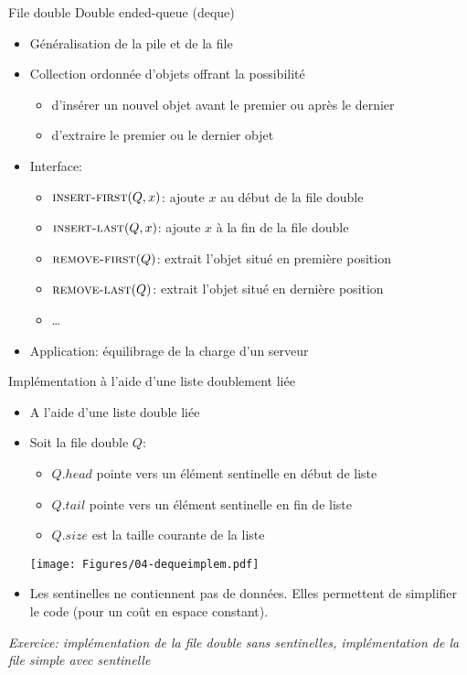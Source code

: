 \begin{frame}{File double}
Double ended-queue (deque)

\bigskip

\begin{itemize}
\item Généralisation de la pile et de la file
\item Collection ordonnée d'objets offrant la possibilité 
\begin{itemize}
\item d'insérer un nouvel objet \alert{avant le premier} ou \alert{après le dernier}
\item d'extraire le \alert{premier} ou le \alert{dernier} objet
\end{itemize}
\item Interface:
\begin{itemize}
\item $\textnormal{\scshape insert-first}(Q,x)$: ajoute $x$ au début de la file double
\item $\textnormal{\scshape insert-last}(Q,x)$: ajoute $x$ à la fin de la file double
\item $\textnormal{\scshape remove-first}(Q)$: extrait l'objet situé en première position
\item $\textnormal{\scshape remove-last}(Q)$: extrait l'objet situé en dernière position
\item \ldots
\end{itemize}
\item Application: équilibrage de la charge d'un serveur
\end{itemize}

\end{frame}

\begin{frame}{Implémentation à l'aide d'une liste doublement liée}
\begin{itemize}
\item A l'aide d'une liste double liée
\item Soit la file double $Q$:
\begin{itemize}
\item $Q.head$ pointe vers un élément \alert{sentinelle} en début de liste
\item $Q.tail$ pointe vers un élément \alert{sentinelle} en fin de liste
\item $Q.size$ est la taille courante de la liste
\end{itemize}

\centerline{\texttt{[image: Figures/04-dequeimplem.pdf]}}

\item Les sentinelles ne contiennent pas de données. Elles permettent
  de simplifier le code (pour un coût en espace constant).
\end{itemize}

\bigskip

{\it Exercice: implémentation de la file double sans
  sentinelles, implémentation de la file simple avec sentinelle}

\end{frame}

